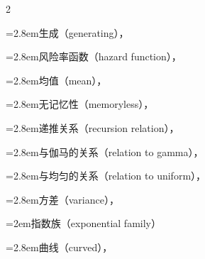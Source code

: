 \begin{multicols}{2}
\par\noindent\hangindent=2.8em\hspace*{1.8em}\label{idx:290}生成（generating），\hyperref[ex:5.6.3]{\pageref*{ex:5.6.3}}\par
\par\noindent\hangindent=2.8em\hspace*{1.8em}\label{idx:291}风险率函数（hazard function），\hyperref[idxocc:291:139]{\pageref*{idxocc:291:139}}\par
\par\noindent\hangindent=2.8em\hspace*{1.8em}\label{idx:292}均值（mean），\hyperref[ex:2.2.2]{\pageref*{ex:2.2.2}}\par
\par\noindent\hangindent=2.8em\hspace*{1.8em}\label{idx:293}无记忆性（memoryless），\hyperref[idxocc:293:114]{\pageref*{idxocc:293:114}}\par
\par\noindent\hangindent=2.8em\hspace*{1.8em}\label{idx:294}递推关系（recursion relation），\hyperref[eq:2.4.7]{\pageref*{eq:2.4.7}}\par
\par\noindent\hangindent=2.8em\hspace*{1.8em}\label{idx:295}与伽马的关系（relation to gamma），\hyperref[exercise:4.38]{\pageref*{exercise:4.38}}\par
\par\noindent\hangindent=2.8em\hspace*{1.8em}\label{idx:296}与均匀的关系（relation to uniform），\hyperref[ex:2.1.4]{\pageref*{ex:2.1.4}}\par
\par\noindent\hangindent=2.8em\hspace*{1.8em}\label{idx:297}方差（variance），\hyperref[ex:2.3.3]{\pageref*{ex:2.3.3}}\par
{}
\par\noindent\hangindent=2em\hspace*{1em}\label{idx:298}指数族（exponential family）\par
\par\noindent\hangindent=2.8em\hspace*{1.8em}\label{idx:299}曲线（curved），\hyperref[idxocc:299:208]{\pageref*{idxocc:299:208}}\par

\end{multicols}
